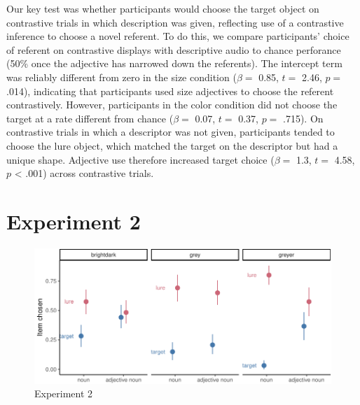 \documentclass[10pt, letterpaper]{article}
\newenvironment{CodeChunk}{}{}
\begin{document}
Our key test was whether participants would choose the target object on
contrastive trials in which description was given, reflecting use of a
contrastive inference to choose a novel referent. To do this, we compare
participants' choice of referent on contrastive displays with
descriptive audio to chance perforance (50\% once the adjective has
narrowed down the referents). The intercept term was reliably different
from zero in the size condition (\(\beta =\) 0.85, \(t =\) 2.46, \(p =\)
.014), indicating that participants used size adjectives to choose the
referent contrastively. However, participants in the color condition did
not choose the target at a rate different from chance (\(\beta =\) 0.07,
\(t =\) 0.37, \(p =\) .715). On contrastive trials in which a descriptor
was not given, participants tended to choose the lure object, which
matched the target on the descriptor but had a unique shape. Adjective
use therefore increased target choice (\(\beta =\) 1.3, \(t =\) 4.58,
\(p\) \textless{} .001) across contrastive trials.

\section{Experiment 2}\label{experiment-2}

\begin{CodeChunk}
\begin{figure}[tb]

{\centering \includegraphics{figs/e2_fig-1} 

}

\caption[Experiment 2]{Experiment 2}\label{fig:e2_fig}
\end{figure}
\end{CodeChunk}
\end{document}
